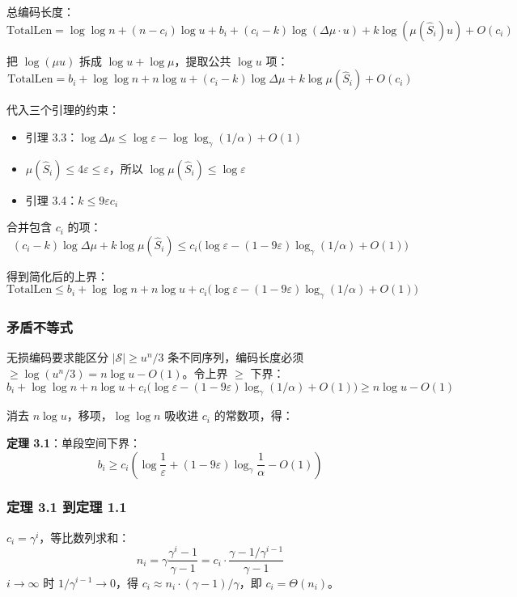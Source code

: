 \documentclass[UTF8,11pt,a4paper]{ctexart}
\begin{document}
总编码长度：
\[
\text{TotalLen} = \log\log n + (n-c_i)\log u + b_i + (c_i-k)\log(\Delta\mu \cdot u) + k\log(\mu(\hat{S}_i)u) + O(c_i)
\]

把 $\log(\mu u)$ 拆成 $\log u + \log \mu$，提取公共 $\log u$ 项：
\[
\text{TotalLen} = b_i + \log\log n + n\log u + (c_i - k)\log\Delta\mu + k\log\mu(\hat{S}_i) + O(c_i)
\]

代入三个引理的约束：
\begin{itemize}
    \item 引理 3.3：$\log\Delta\mu \le \log\varepsilon - \log\log_\gamma(1/\alpha) + O(1)$
    \item $\mu(\hat{S}_i) \le 4\varepsilon \le \varepsilon$，所以 $\log\mu(\hat{S}_i) \le \log\varepsilon$
    \item 引理 3.4：$k \le 9\varepsilon c_i$
\end{itemize}

合并包含 $c_i$ 的项：
\[
(c_i - k)\log\Delta\mu + k\log\mu(\hat{S}_i) \le c_i\bigl(\log\varepsilon - (1-9\varepsilon)\log_\gamma(1/\alpha) + O(1)\bigr)
\]

得到简化后的上界：
\[
\text{TotalLen} \le b_i + \log\log n + n\log u + c_i\bigl(\log\varepsilon - (1-9\varepsilon)\log_\gamma(1/\alpha) + O(1)\bigr)
\]

\subsubsection{矛盾不等式}

无损编码要求能区分 $|\mathcal{S}| \ge u^n/3$ 条不同序列，编码长度必须 $\ge \log(u^n/3) = n\log u - O(1)$。令上界 $\ge$ 下界：
\[
b_i + \log\log n + n\log u + c_i\bigl(\log\varepsilon - (1-9\varepsilon)\log_\gamma(1/\alpha) + O(1)\bigr) \ge n\log u - O(1)
\]

消去 $n\log u$，移项，$\log\log n$ 吸收进 $c_i$ 的常数项，得：

\textbf{定理 3.1}：单段空间下界：
\[
b_i \ge c_i\left(\log\frac{1}{\varepsilon} + (1-9\varepsilon)\log_\gamma\frac{1}{\alpha} - O(1)\right)
\]

\subsubsection{定理 3.1 到定理 1.1}

$c_i = \gamma^i$，等比数列求和：
\[
n_i = \gamma\frac{\gamma^i-1}{\gamma-1} = c_i \cdot \frac{\gamma - 1/\gamma^{i-1}}{\gamma-1}
\]
$i \to \infty$ 时 $1/\gamma^{i-1} \to 0$，得 $c_i \approx n_i \cdot (\gamma-1)/\gamma$，即 $c_i = \Theta(n_i)$。
\end{document}
